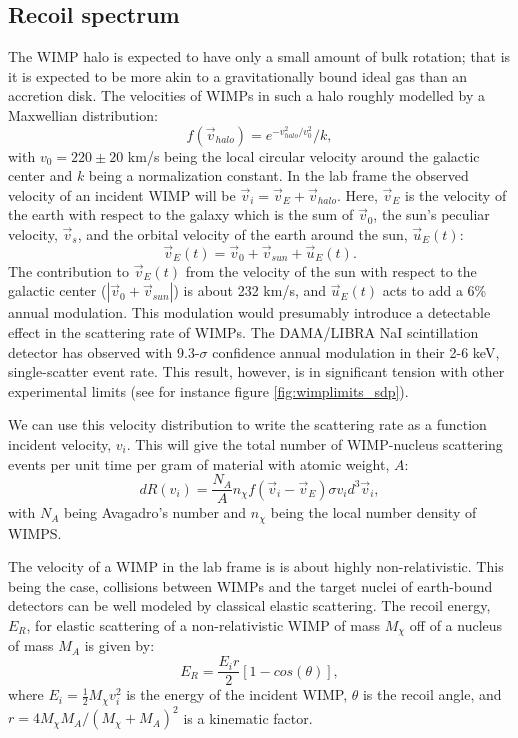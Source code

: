 \subsection{Recoil spectrum}
The WIMP halo is expected to have only a small amount of bulk rotation; that is it is expected to be more akin to a gravitationally bound ideal gas than an accretion disk. The velocities of WIMPs in such a halo roughly modelled by a Maxwellian distribution\cite{dmintro}:
\begin{equation}\label{eq:veldist}
f(\vec{v}_{halo})= e^{-v_{halo}^2/v_0^2}/k,
\end{equation}
with $v_0=220\pm 20$ km/s being the local circular velocity around the galactic center and $k$ being a normalization constant. In the lab frame the observed velocity of an incident WIMP will be $\vec{v}_i=\vec{v}_E+\vec{v}_{halo}$. Here, $\vec{v}_E$ is the velocity of the earth with respect to the galaxy which is the sum of $\vec{v}_0$, the sun's peculiar velocity, $\vec{v}_s$, and the orbital velocity of the earth around the sun, $\vec{u}_E(t)$\cite{dmvelocity,dmintro}:
\begin{equation}
\vec{v}_E(t)=\vec{v}_0+\vec{v}_{sun}+\vec{u}_E(t).
\end{equation}
The contribution  to $\vec{v}_E(t)$ from the velocity of the sun with respect to the galactic center ($|\vec{v}_0+\vec{v}_{sun}|$) is about 232 km/s, and $\vec{u}_E(t)$ acts to add a 6\% annual modulation. This modulation would presumably introduce a detectable effect in the scattering rate of WIMPs. The DAMA/LIBRA NaI scintillation detector\cite{dama} has observed with 9.3-$\sigma$ confidence annual modulation in their 2-6 keV, single-scatter event rate. This result, however, is in significant tension with other experimental limits (see for instance figure \ref{fig:wimplimits_sdp}).

We can use this velocity distribution to write the scattering rate as a function incident velocity, $v_i$. This will give the total number of WIMP-nucleus scattering events per unit time per gram of material with atomic weight, $A$:
\begin{equation}
dR(v_i)=\frac{N_A}{A}n_{\chi}f(\vec{v}_i-\vec{v}_E)\sigma v_i d^3\vec{v}_i,
\end{equation}
with $N_A$ being Avagadro's number and $n_{\chi}$ being the local number density of WIMPS.

The velocity of a WIMP in the lab frame is is about  highly non-relativistic. This being the case, collisions between WIMPs and the target nuclei of earth-bound detectors can be well modeled by classical elastic scattering. The recoil energy, $E_R$, for elastic scattering of a non-relativistic WIMP of mass $M_{\chi}$ off of a nucleus of mass $M_A$ is given by\cite{dmintro}:
\begin{equation}\label{eq:recoilE}
E_R=\frac{E_ir}{2}[1-cos(\theta)],
\end{equation}
where $E_i=\frac{1}{2}M_{\chi}v_i^2$ is the energy of the incident WIMP, $\theta$ is the recoil angle, and $r=4M_{\chi}M_{A}/(M_{\chi}+M_{A})^2$ is a kinematic factor. 

